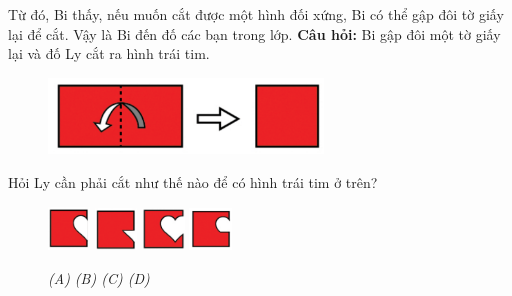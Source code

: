 Từ đó, Bi thấy, nếu muốn cắt được một hình đối xứng, Bi có thể gập đôi tờ giấy lại để cắt. Vậy là Bi đến đố các bạn trong lớp.
\vskip 0.1cm
\textbf{Câu hỏi:} Bi gập đôi một tờ giấy lại và đố Ly cắt ra hình trái tim.
\begin{figure}[H]
	\centering
	\captionsetup{labelformat=empty}
	\vspace*{-5pt}
	\captionsetup{justification=centering}
	\includegraphics[width =0.65\textwidth]{cat-4}
	\vspace*{-10pt}
\end{figure}
Hỏi Ly cần phải cắt như thế nào để có hình trái tim ở trên?
\begin{figure}[H]
	\centering
	\captionsetup{labelformat=empty}
	\vspace*{-4pt}
	\captionsetup{justification=centering}
	\includegraphics[width =0.1\textwidth]{cat-4a}
	\hfill
	\includegraphics[width =0.1\textwidth]{cat-4b}
	\hfill
	\includegraphics[width =0.1\textwidth]{cat-4c}
	\hfill
	\includegraphics[width =0.1\textwidth]{cat-4d}
	\vspace*{-5pt}
	\caption{\small \it (A)\hspace*{75pt} (B)\hspace*{75pt} (C) \hspace*{75pt} (D)}
	\vspace*{-10pt}
\end{figure}
